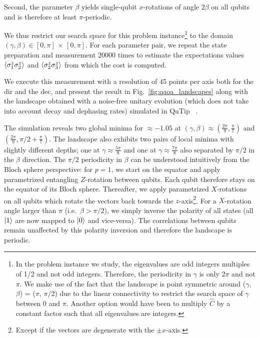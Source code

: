 Second, the parameter $\beta$ yields single-qubit $x$-rotations of angle $2\beta$ on all qubits and is therefore at least $\pi$-periodic.

We thus restrict our search space for this problem instance\footnote{In the problem instance we study, the eigenvalues are odd integers multiples of 1/2 and not odd integers. Therefore, the periodicity in $\gamma$ is only $2\pi$ and not $\pi$. We make use of the fact that the landscape is point symmetric around ($\gamma$, $\beta$) = ($\pi$, $\pi/2$) due to the linear connectivity to restrict the search space of $\gamma$ between 0 and $\pi$. Another option would have been to multiply $\hat C$ by a constant factor such that all eigenvalues are integers.} to the domain $(\gamma, \beta) \in [0, \pi] \,\times\, [0, \pi]$. For each parameter pair, we repeat the state preparation and measurement 20000 times to estimate the expectations values $\langle\sigma_{1}^z \sigma_{2}^z\rangle$ and $\langle \sigma_{2}^z \sigma_{3}^z \rangle$ from which the cost \cost{} is computed.

We execute this measurement with a resolution of 45 points per axis both for the \gls{dir} and the \gls{dec}, and present the result in Fig.~\ref{fig:qaoa_landscapes} along with the landscape obtained with a noise-free unitary evolution (which does not take into account decay and dephasing rates) simulated in QuTip~\cite{Johansson2013QuTiPSystems} .

The simulation reveals two global minima for \cost{} $\approx -1.05$ at $(\gamma, \beta) \approx (\frac{2\pi}{9}, \frac{\pi}{7})$ and $(\frac{2\pi}{9},\pi/2 + \frac{\pi}{7})$.  The landscape also exhibits two pairs of local minima with slightly different depths; one at $\gamma \approx \frac{5\pi}{8}$ and one at $\gamma \approx \frac{7\pi}{8}$ also separated by $\pi/2$ in the $\beta$ direction. The $\pi/2$ periodicity in $\beta$ can be understood intuitively from the Bloch sphere perspective: for $p=1$, we start on the equator and apply parametrized entangling $Z$-rotation between qubits. Each qubit therefore stays on the equator of its Bloch sphere. Thereafter, we apply parametrized $X$-rotations on all qubits which rotate the vectors back towards the $z$-axis\footnote{Except if the vectors are degenerate with the $\pm x$-axis.}. For a $X$-rotation angle larger than $\pi$ (i.e.\ $\beta>\pi/2$), we simply inverse the polarity of all states (all $\ket{1}$ are now mapped to $\ket{0}$ and vice-versa). The correlations between qubits remain unaffected by this polarity inversion and therefore the landscape is periodic.


